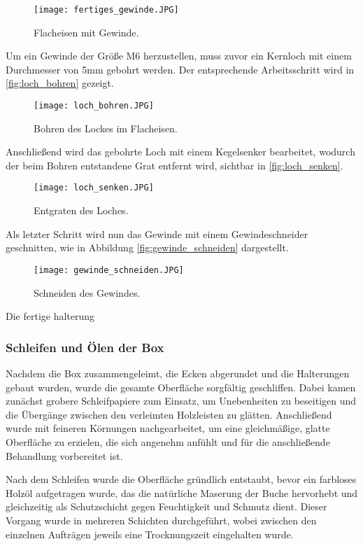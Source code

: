 \begin{figure}[H]
    \centering
    \texttt{[image: fertiges\_gewinde.JPG]}
    \caption{Flacheisen mit Gewinde.}
    \label{fig:fertiges_gewinde}
\end{figure}

Um ein Gewinde der Größe M6 herzustellen, muss zuvor ein Kernloch mit einem
Durchmesser von 5mm gebohrt werden. Der entsprechende Arbeitsschritt wird in
\autoref{fig:loch_bohren} gezeigt.

\begin{figure}[H]
    \centering
    \texttt{[image: loch\_bohren.JPG]}
    \caption{Bohren des Lockes im Flacheisen.}
    \label{fig:loch_bohren}
\end{figure}

\newpage

Anschließend wird das gebohrte Loch mit einem Kegelsenker bearbeitet, wodurch
der beim Bohren entstandene Grat entfernt wird, sichtbar in \autoref{fig:loch_senken}.

\begin{figure}[H]
    \centering
    \texttt{[image: loch\_senken.JPG]}
    \caption{Entgraten des Loches.}
    \label{fig:loch_senken}
\end{figure}

Als letzter Schritt wird nun das Gewinde mit einem Gewindeschneider geschnitten,
wie in Abbildung \autoref{fig:gewinde_schneiden} dargestellt.

\begin{figure}[H]
    \centering
    \texttt{[image: gewinde\_schneiden.JPG]}
    \caption{Schneiden des Gewindes.}
    \label{fig:gewinde_schneiden}
\end{figure}

\newpage

Die fertige halterung 


\subsubsection{Schleifen und Ölen der Box}

Nachdem die Box zusammengeleimt, die Ecken abgerundet und die Halterungen
gebaut wurden, wurde die gesamte Oberfläche sorgfältig geschliffen.
Dabei kamen zunächst grobere Schleifpapiere zum Einsatz, um Unebenheiten zu
beseitigen und die Übergänge zwischen den verleimten Holzleisten zu glätten.
Anschließend wurde mit feineren Körnungen nachgearbeitet, um eine gleichmäßige,
glatte Oberfläche zu erzielen, die sich angenehm anfühlt und für die
anschließende Behandlung vorbereitet ist.

Nach dem Schleifen wurde die Oberfläche gründlich entstaubt,
bevor ein farbloses Holzöl aufgetragen wurde, das die natürliche Maserung
der Buche hervorhebt und gleichzeitig als Schutzschicht gegen Feuchtigkeit
und Schmutz dient. Dieser Vorgang wurde in mehreren Schichten durchgeführt,
wobei zwischen den einzelnen Aufträgen jeweils eine Trocknungszeit eingehalten wurde.

